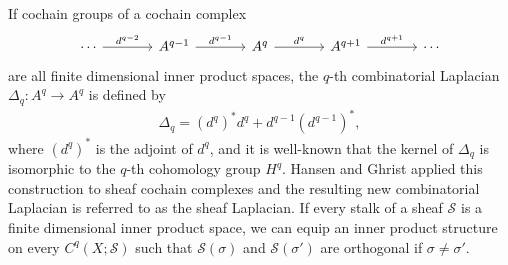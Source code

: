 \documentclass[11pt]{article}
\theoremstyle{definition}
\theoremstyle{definition}
\begin{document}
If cochain groups of a cochain complex
\[
    \begin{tikzcd}[column sep = large]
        \centering
    \cdots \arrow[r, "d^{q-2}"] & 
    A^{q-1} \arrow[r, "d^{q-1}"] & 
    A^q \arrow[r, "d^q"] & 
    A^{q+1} \arrow[r, "d^{q+1}"] & 
    \cdots
    \end{tikzcd} 
\]
are all finite dimensional inner product spaces,
the $q$-th combinatorial Laplacian $\Delta_q: A^{q} \to A^{q}$ is defined by
\begin{align*}
    \Delta_q = (d^{q})^{\ast}d^q + d^{q-1}(d^{q-1})^{\ast},
\end{align*}
where $(d^q)^{\ast}$ is the adjoint of $d^q$, and it is well-known that the kernel of $\Delta_q$ is isomorphic to the $q$-th cohomology group $H^q$.
Hansen and Ghrist \cite{hansen2019toward} applied this construction to sheaf cochain complexes and the resulting new combinatorial Laplacian is referred to as the sheaf Laplacian. 
If every stalk of a sheaf $\mathscr{S}$ is a finite dimensional inner product space, 
we can equip an inner product structure on every $C^q(X; \mathscr{S})$
such that $\mathscr{S}(\sigma)$ and $\mathscr{S}(\sigma')$ are orthogonal if $\sigma \neq \sigma'$.
\end{document}
